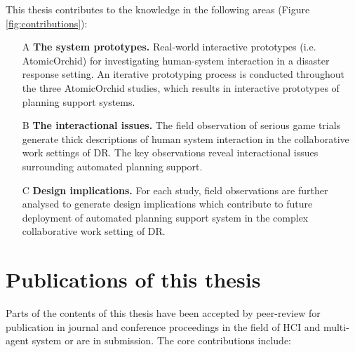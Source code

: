 This thesis contributes to the knowledge in the following areas (Figure \ref{fig:contributions}): \\

\begin{enumerate}
\item[A] \textbf{The system prototypes.} Real-world interactive prototypes (i.e. AtomicOrchid) for investigating human-system interaction in a disaster response setting. An iterative prototyping process is conducted throughout the three AtomicOrchid studies, which results in interactive prototypes of planning support systems. 
  
  \item[B] \textbf{The interactional issues.} The field observation of serious game trials generate thick descriptions of human system interaction in the collaborative work settings of \ac{DR}. The key observations reveal interactional issues surrounding automated planning support.
  
  \item[C] \textbf{Design implications.} For each study, field observations are further analysed to generate design implications which contribute to future deployment of automated planning support system in the complex collaborative work setting of \ac{DR}. 
\end{enumerate}


\section{Publications of this thesis} 
Parts of the contents of this thesis have been accepted by peer-review for publication in journal and conference proceedings in the field of \ac{HCI} and multi-agent system or are in submission. The core contributions include: \\



